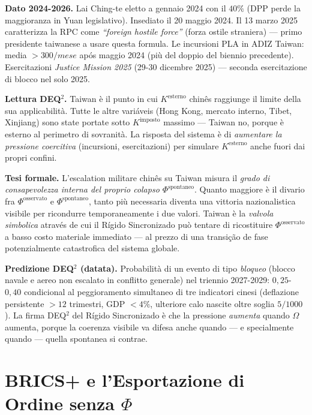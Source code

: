 \Proved{} \textbf{Dato 2024-2026.} Lai Ching-te eletto a gennaio 2024
con il \(40\%\) (DPP perde la maggioranza in Yuan legislativo).
Insediato il 20 maggio 2024. Il 13 marzo 2025 caratterizza la RPC come
\emph{``foreign hostile force''} (forza ostile straniera) --- primo
presidente taiwanese a usare questa formula. Le incursioni PLA in ADIZ
Taiwan: media \(> 300/mese\) após maggio 2024 (più del doppio del
biennio precedente). Esercitazioni \emph{Justice Mission 2025} (29-30
dicembre 2025) --- seconda esercitazione di blocco nel solo 2025.

\Hypoth{} \textbf{Lettura DEQ$^2$.} Taiwan è il punto in cui
\(K^{\text{esterno}}\) chinês raggiunge il limite della sua
applicabilità. Tutte le altre variáveis (Hong Kong, mercato interno,
Tibet, Xinjiang) sono state portate sotto \(K^{\text{imposto}}\) massimo
--- Taiwan no, porque è esterno al perimetro di sovranità. La risposta
del sistema è di \emph{aumentare la pressione coercitiva} (incursioni,
esercitazioni) per simulare \(K^{\text{esterno}}\) anche fuori dai
propri confini.

\Hypoth{} \textbf{Tesi formale.} L'escalation militare chinês su Taiwan
misura il \emph{grado di consapevolezza interna del proprio colapso
\(\Phi^{\text{spontaneo}}\)}. Quanto maggiore è il divario fra
\(\Phi^{\text{osservato}}\) e \(\Phi^{\text{spontaneo}}\), tanto più
necessaria diventa una vittoria nazionalistica visibile per ricondurre
temporaneamente i due valori. Taiwan è la \emph{valvola simbolica}
através de cui il Rígido Sincronizado può tentare di ricostituire
\(\Phi^{\text{osservato}}\) a basso costo materiale immediato --- al
prezzo di una transição de fase potenzialmente catastrofica del
sistema globale.

\Conj{} \textbf{Predizione DEQ$^2$ (datata).} Probabilità di un evento di
tipo \emph{bloqueo} (blocco navale e aereo non escalato in conflitto
generale) nel triennio 2027-2029: \(0{,}25\)-\(0{,}40\) condicional al
peggioramento simultaneo di tre indicatori cinesi (deflazione
persistente \(> 12\) trimestri, GDP \(< 4\%\), ulteriore calo nascite
oltre soglia \(5/1000\)). La firma DEQ$^2$ del Rígido Sincronizado è che
la pressione \emph{aumenta} quando \(\Omega\) aumenta, porque la
coerenza visibile va difesa anche quando --- e specialmente quando ---
quella spontanea si contrae.



\section{\texorpdfstring{BRICS+ e l'Esportazione di Ordine senza
\(\Phi\)}{BRICS+ e l'Esportazione di Ordine senza \textbackslash Phi}}\label{brics-e-lesportazione-di-ordine-senza-phi}


